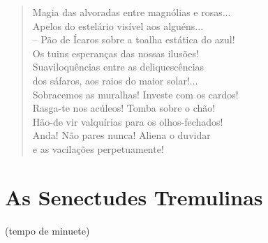 \begin{verse}
Magia das alvoradas entre magnólias e rosas...\\
Apelos do estelário visível aos alguéns...\\
-- Pão de Ícaros sobre a toalha estática do azul!\\
Os tuins esperanças das nossas ilusões!\\
Suaviloquências entre as deliquescências\\
dos sáfaros, aos raios do maior solar!...\\
Sobracemos as muralhas! Investe com os cardos!\\
Rasga-te nos acúleos! Tomba sobre o chão!\\
Hão-de vir valquírias para os olhos-fechados!\\
Anda! Não pares nunca! Aliena o duvidar\\
e as vacilações perpetuamente!
\end{verse}

\section*{As Senectudes Tremulinas}

\begin{flushright}
(tempo de minuete)
\end{flushright}

